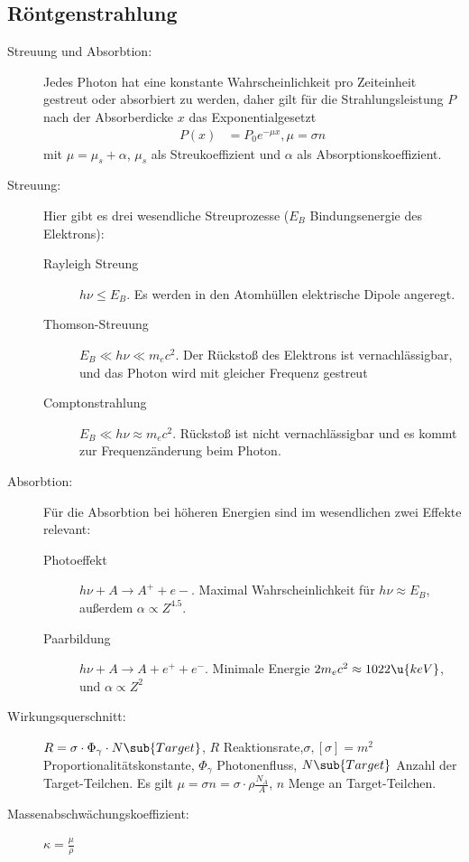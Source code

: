 \documentclass[twocolumn]{summery_4.1}
\begin{document}
\subsection{Röntgenstrahlung}
\begin{description}
    \item[Streuung und Absorbtion:] Jedes Photon hat eine konstante Wahrscheinlichkeit pro Zeiteinheit gestreut oder absorbiert zu werden, daher gilt für die Strahlungsleistung \(P\) nach der Absorberdicke \(x\) das Exponentialgesetzt
    \begin{align*}
        P(x) &= P_0 e^{-\mu x}, \mu = \sigma n
    \end{align*}  
    mit $\mu = \mu_s+\alpha$, \(\mu_s\) als Streukoeffizient und \(\alpha\) als Absorptionskoeffizient.
    \item[Streuung:] Hier gibt es drei wesendliche Streuprozesse ($E_B$ Bindungsenergie des Elektrons):
    \begin{description}
        \item[Rayleigh Streung] \(h\nu  \le E_B\). Es werden in den Atomhüllen elektrische Dipole angeregt.   
        \item[Thomson-Streuung] \(E_B\ll h\nu\ll m_ec^2\). Der Rückstoß des Elektrons ist vernachlässigbar, und das Photon wird mit gleicher Frequenz gestreut 
        \item[Comptonstrahlung] \(E_B\ll h\nu \approx m_ec^2\). Rückstoß ist nicht vernachlässigbar und es kommt zur Frequenzänderung beim Photon.  
    \end{description}
    \item[Absorbtion:] Für die Absorbtion bei höheren Energien sind im wesendlichen zwei Effekte relevant:
    \begin{description}
        \item[Photoeffekt] \(h\nu + A\to A^+ + e-\). Maximal Wahrscheinlichkeit für \(h\nu \approx E_B\), außerdem \(\alpha\propto Z^{4.5}\).
        \item[Paarbildung] \(h\nu + A \to A + e^+ + e^-\). Minimale Energie \(2 m_e c^2 \approx 1022\u{keV}\), und \(\alpha\propto Z^2\) 
    \end{description}
    \item[Wirkungsquerschnitt:] \(R = \sigma\cdot \Phi_\gamma \cdot N\sub{Target}\), \(R\) Reaktionsrate,\(\sigma, [\sigma]=m^2\) Proportionalitätskonstante, \(\Phi_\gamma\) Photonenfluss, \(N\sub{Target}\) Anzahl der Target-Teilchen. Es gilt \(\mu = \sigma n =\sigma \cdot \rho \frac{N_A}A\), \(n\) Menge an Target-Teilchen. 
    \item[Massenabschwächungskoeffizient:] \(\kappa =\frac{\mu}\rho\)
\end{description}
\end{document}
